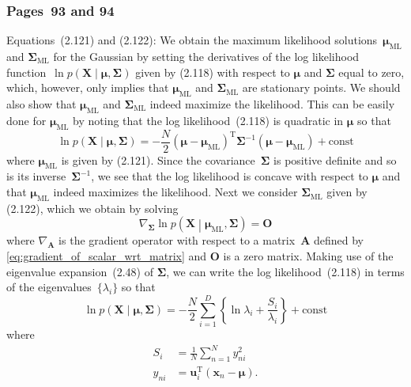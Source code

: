 \documentclass[12pt,a4paper]{article}
\newcommand{\erratum}[1]{%
\subsubsection*{#1}
\addcontentsline{toc}{subsection}{#1}}
\begin{document}
\erratum{Pages~93 and 94}
Equations~(2.121) and (2.122):
We obtain the maximum likelihood solutions~$\bm{\mu}_\text{ML}$ and $\bm{\Sigma}_\text{ML}$
for the Gaussian by setting the derivatives of
the log likelihood function~$\ln p\left(\mathbf{X}\middle| \bm{\mu}, \bm{\Sigma}\right)$
given by (2.118) with respect to $\bm{\mu}$ and $\bm{\Sigma}$ equal to zero,
which, however, only implies that $\bm{\mu}_\text{ML}$ and $\bm{\Sigma}_\text{ML}$ are
stationary points.
We should also show that
$\bm{\mu}_\text{ML}$ and $\bm{\Sigma}_\text{ML}$ indeed maximize the likelihood.
This can be easily done for $\bm{\mu}_\text{ML}$ by noting that
the log likelihood~(2.118) is quadratic in $\bm{\mu}$ so that
\begin{equation}
\ln p\left(\mathbf{X}\middle| \bm{\mu}, \bm{\Sigma}\right) =
-\frac{N}{2}
\left(\bm{\mu} - \bm{\mu}_{\text{ML}}\right)^{\operatorname{T}} \bm{\Sigma}^{-1}
\left(\bm{\mu} - \bm{\mu}_{\text{ML}}\right)
+ \text{const}
\end{equation}
where $\bm{\mu}_{\text{ML}}$ is given by (2.121).
Since the covariance~$\bm{\Sigma}$ is positive definite and so is its inverse~$\bm{\Sigma}^{-1}$,
we see that the log likelihood is concave with respect to $\bm{\mu}$ and
that $\bm{\mu}_\text{ML}$ indeed maximizes the likelihood.
Next we consider $\bm{\Sigma}_\text{ML}$ given by (2.122), which we obtain by solving
\begin{equation}
\nabla_{\bm{\Sigma}} \ln p\left(\mathbf{X}\middle| \bm{\mu}_\text{ML}, \bm{\Sigma}\right)
= \mathbf{O}
\label{eq:maximum_likelihood_equation_for_covariance}
\end{equation}
where $\nabla_{\mathbf{A}}$ is the gradient operator with respect to a matrix~$\mathbf{A}$
defined by \eqref{eq:gradient_of_scalar_wrt_matrix} and
$\mathbf{O}$ is a zero matrix.
Making use of the eigenvalue expansion~(2.48) of $\bm{\Sigma}$,
we can write the log likelihood~(2.118) in terms of the eigenvalues~$\{\lambda_i\}$ so that
\begin{equation}
\ln p\left(\mathbf{X}\middle| \bm{\mu}, \bm{\Sigma}\right) =
-\frac{N}{2} \sum_{i=1}^{D} \left\{
\ln \lambda_i
+ \frac{S_i}{\lambda_i}
\right\}
+ \text{const}
\label{eq:log_likelihood_in_terms_of_eigenvalues}
\end{equation}
where
\begin{align}
S_{i} &= \frac{1}{N} \sum_{n=1}^{N} y_{ni}^{2} \\
y_{ni} &= \mathbf{u}_{i}^{\operatorname{T}}\left(\mathbf{x}_n - \bm{\mu}\right) .
\end{align}
\end{document}
